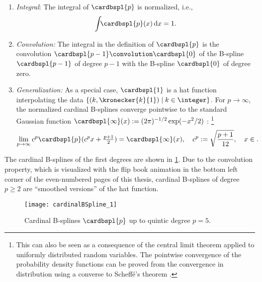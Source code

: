 \begin{enumerate}
  \item
  \emph{Integral}:
  The integral of $\cardbspl{p}$ is normalized, i.e.,
  \begin{equation}
    \int_{\real} \cardbspl{p}(x) \dx = 1.
  \end{equation}
  
  \item
  \emph{Convolution:}
  The integral in the definition of $\cardbspl{p}$
  is the convolution $\cardbspl{p-1} \convolution \cardbspl{0}$
  of the B-spline $\cardbspl{p-1}$
  of degree $p - 1$ with the B-spline $\cardbspl{0}$ of degree zero.
  
  \item
  \emph{Generalization:}
  As a special case, $\cardbspl{1}$ is a hat function interpolating the data
  $\{(k, \kronecker{k}{1}) \mid k \in \integer\}$.
  For $p \to \infty$, the normalized cardinal B-splines converge
  pointwise to the standard Gaussian function
  $\cardbspl{\infty}(x) := (2\pi)^{-1/2} \exp(-x^2/2)$ \cite{Unser92Asymptotic}:%
  \footnote{%
    This can also be seen as a consequence of the central limit theorem
    applied to uniformly distributed random variables.
    The pointwise convergence of the probability density functions
    can be proved from the convergence
    in distribution using a converse to Scheffé's theorem
    \cite{Boos85Converse}.%
  }
  \begin{equation}
    \lim_{p \to \infty}
    c^p \cardbspl{p}(c^p x + \tfrac{p+1}{2})
    = \cardbspl{\infty}(x),\quad
    c^p := \sqrt{\frac{p+1}{12}},\quad
    x \in \real.
  \end{equation}
\end{enumerate}
The cardinal B-splines of the first degrees are shown in
\cref{fig:cardinalBSpline}.
Due to the convolution property,
which is visualized with the flip book animation in the bottom left corner
of the even-numbered pages of this thesis,
cardinal B-splines of degree $p \ge 2$ are ``smoothed versions''
of the hat function.

\begin{figure}
  \texttt{[image: cardinalBSpline\_1]}%
  \caption[%
    Cardinal B-splines%
  ]{%
    Cardinal B-splines $\cardbspl{p}$ up to quintic degree $p = 5$.%
  }%
  \label{fig:cardinalBSpline}%
\end{figure}

